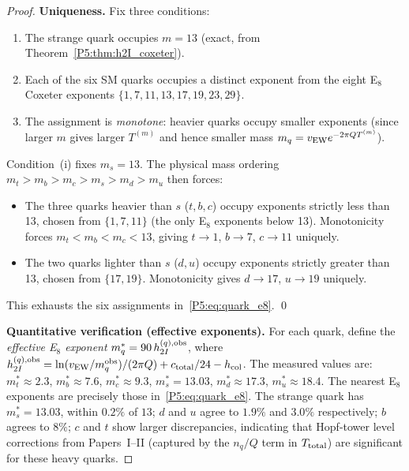 \documentclass[11pt,a4paper]{article}
\theoremstyle{definition}
\theoremstyle{remark}
\begin{document}
\begin{proof}
\textbf{Uniqueness.}
Fix three conditions:
\begin{enumerate}[noitemsep,label=(\roman*)]
\item The strange quark occupies $m=13$ (exact, from Theorem~\ref{P5:thm:h2I_coxeter}).
\item Each of the six SM quarks occupies a distinct exponent from
  the eight E$_8$ Coxeter exponents $\{1,7,11,13,17,19,23,29\}$.
\item The assignment is \emph{monotone}: heavier quarks occupy smaller exponents
  (since larger $m$ gives larger $T^{(m)}$ and hence smaller mass
  $m_q = v_{\rm EW}e^{-2\pi Q T^{(m)}}$).
\end{enumerate}
Condition~(i) fixes $m_s = 13$.  The physical mass ordering
$m_t > m_b > m_c > m_s > m_d > m_u$ then forces:
\begin{itemize}[noitemsep]
\item The three quarks heavier than $s$ ($t,b,c$) occupy exponents
  strictly less than 13, chosen from $\{1,7,11\}$ (the only E$_8$
  exponents below 13).  Monotonicity forces $m_t < m_b < m_c < 13$,
  giving $t\to1$, $b\to7$, $c\to11$ uniquely.
\item The two quarks lighter than $s$ ($d,u$) occupy exponents
  strictly greater than 13, chosen from $\{17,19\}$.
  Monotonicity gives $d\to17$, $u\to19$ uniquely.
\end{itemize}
This exhausts the six assignments in~\eqref{P5:eq:quark_e8}. \qed

\textbf{Quantitative verification (effective exponents).}
For each quark, define the \emph{effective E$_8$ exponent}
$m_q^* = 90\,h_{2I}^{(q),\rm obs}$, where
$h_{2I}^{(q),\rm obs} = \ln(v_{\rm EW}/m_q^{\rm obs})/(2\pi Q)
+ c_{\rm total}/24 - h_{\rm col}$.
The measured values are:
$m_t^*\approx 2.3$, $m_b^*\approx 7.6$, $m_c^*\approx 9.3$,
$m_s^*=13.03$, $m_d^*\approx 17.3$, $m_u^*\approx 18.4$.
The nearest E$_8$ exponents are precisely those in~\eqref{P5:eq:quark_e8}.
The strange quark has $m_s^* = 13.03$, within $0.2\%$ of $13$;
$d$ and $u$ agree to $1.9\%$ and $3.0\%$ respectively;
$b$ agrees to $8\%$; $c$ and $t$ show larger discrepancies,
indicating that Hopf-tower level corrections from Papers~I--II
(captured by the $n_q/Q$ term in $T_{\rm total}$) are significant
for these heavy quarks.
\end{proof}
\end{document}
